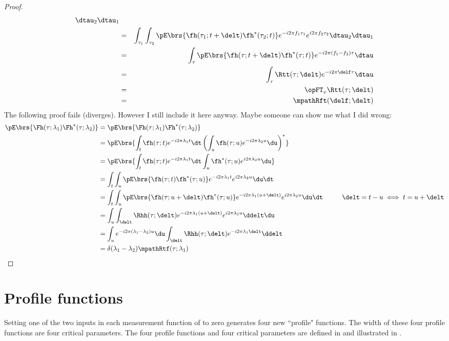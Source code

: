 \begin{proof}
\begin{eqnarray*}
{            \dtau_2 \dtau_1}
   \\&=& \int_{\tau_1}\int_{\tau_2}\pE\brs{
             \fh(\tau_1;t+\delt) \fh^\ast(\tau_2;t) }
              e^{-i2\pi f_1\tau_1}e^{i2\pi f_2\tau_2} 
            \dtau_2 \dtau_1
   \\&=& \int_{\tau}\pE\brs{
             \fh(\tau;t+\delt) \fh^\ast(\tau;t) }
              e^{-i2\pi (f_1-f_2)\tau}
            \dtau
   \\&=& \int_{\tau}\Rtt(\tau;\delt)
              e^{-i2\pi \delf \tau}
            \dtau
   \\&=& \opFT_\tau \Rtt(\tau;\delt)
   \\&=& \mpathRft(\delf;\delt)
\end{eqnarray*}
The following proof fails (diverges).
However I still include it here anyway.
Maybe someone can show me what I did wrong:
\begin{align*}
  \pE\brs{ \Fh(\tau;\lambda_1) \Fh^\ast(\tau;\lambda_2) }
    &= \pE\brs{ \Fh(\tau;\lambda_1) \Fh^\ast(\tau;\lambda_2) }
  \\&= \pE\brs{   \int_t \fh(\tau;t) e^{-i2\pi\lambda_1 t} \dt
       \left( \int_u \fh(\tau;u) e^{-i2\pi\lambda_2 u} \du \right)^\ast
       }
  \\&= \pE\brs{ \int_t \fh     (\tau;t) e^{-i2\pi\lambda_1 t} \dt
            \int_u \fh^\ast(\tau;u) e^{ i2\pi\lambda_2 u} \du 
       }
  \\&= \int_t \int_u  \pE\brs{ \fh(\tau;t) \fh^\ast(\tau;u) }
            e^{-i2\pi\lambda_1t} e^{ i2\pi\lambda_2u} \du \dt 
  \\&= \int_t \int_u  \pE\brs{ \fh(\tau;u+\delt) \fh^\ast(\tau;u) }
            e^{-i2\pi\lambda_1(u+\delt)} e^{ i2\pi\lambda_2u} \du \dt 
       \hspace{1cm}\delt=t-u \iff t=u+\delt
  \\&= \int_u \int_{\delt}  \Rhh(\tau;\delt)
            e^{-i2\pi\lambda_1(u+\delt)} e^{ i2\pi\lambda_2u} \ddelt \du 
  \\&= \int_u e^{-i2\pi(\lambda_1-\lambda_2)u} \du 
       \int_{\delt}  \Rhh(\tau;\delt) e^{-i2\pi\lambda_1\delt}  \ddelt 
  \\&= \delta(\lambda_1-\lambda_2)\mpathRtf(\tau;\lambda_1)
\end{align*}
\end{proof}
\section{Profile functions}
Setting one of the two inputs in each 
measurement function of  to zero
generates four new ``profile" functions.
The width of these four profile functions are four critical parameters.
The four profile functions and four critical parameters are
defined in  and 
illustrated in .


